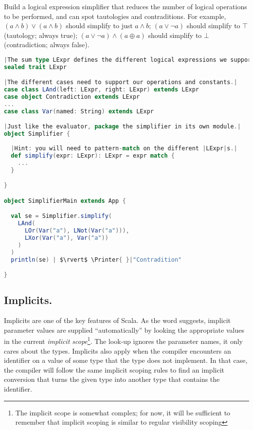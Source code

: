 \documentclass[10 pt]{article}
\begin{document}
\begin{example}
Build a logical expression simplifier that reduces the number of logical operations to be performed, and can spot tautologies and contraditions. For example, $(a \land b) \lor (a \land b)$ should simplify to just $a \land b$; $(a \lor \lnot{a})$ should simplify to $\top$ (tautology; always true); $(a \lor \lnot{a}) \land (a \oplus a)$ should simplify to $\bot$ (contradiction; always false).

\begin{lstlisting}[caption={Logical expression simplifier}, label={code:ls}, language=Scala, escapechar=|]
|The sum type LExpr defines the different logical expressions we support.|
sealed trait LExpr

|The different cases need to support our operations and constants.|
case class LAnd(left: LExpr, right: LExpr) extends LExpr
case object Contradiction extends LExpr
...
case class Var(named: String) extends LExpr

|Just like the evaluator, package the simplifier in its own module.|
object Simplifier {
    
  |Hint: you will need to pattern-match on the different |LExpr|s.|
  def simplify(expr: LExpr): LExpr = expr match {
    ...
  }

}

object SimplifierMain extends App {

  val se = Simplifier.simplify(
    LAnd(
      LOr(Var("a"), LNot(Var("a"))),
      LXor(Var("a"), Var("a"))
    )
  )
  println(se) | $\rvert$ \Printer{ }|"Contradition"

}
\end{lstlisting}

\end{example}
 
\subsection{Implicits.} 
Implicits are one of the key features of Scala. As the word suggests, implicit parameter values are supplied ``automatically'' by looking the appropriate values in the current \emph{implicit scope}\footnote{The implicit scope is somewhat complex; for now, it will be sufficient to remember that implicit scoping is similar to regular visibility scoping}. The look-up ignores the parameter names, it only cares about the types. Implicits also apply when the compiler encounters an identifier on a value of some type that the type does not implement. In that case, the compiler will follow the same implicit scoping rules to find an implicit conversion that turns the given type into another type that contains the identifier. 
\end{document}
